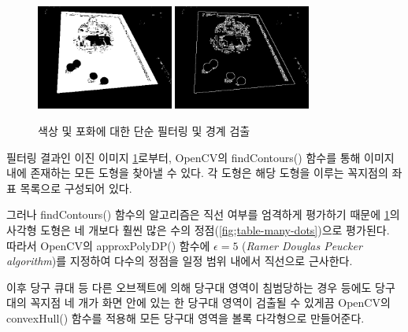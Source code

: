 \documentclass[10pt]{oblivoir}
\begin{document}
\begin{figure}[ht]
    \centering
    \includegraphics[width=0.4\textwidth]{img/billiards-table-filter.png}
    \includegraphics[width=0.4\textwidth]{img/billiards-table-edge.png}
    \caption{색상 및 포화에 대한 단순 필터링 및 경계 검출}
    \label{fig;table-filtered}
\end{figure}

필터링 결과인 이진 이미지 \cref{fig;table-filtered}로부터, OpenCV의 findContours() 함수를 통해 이미지 내에 존재하는 모든 도형을 찾아낼 수 있다. 각 도형은 해당 도형을 이루는 꼭지점의 좌표 목록으로 구성되어 있다.

그러나 findContours() 함수의 알고리즘은 직선 여부를 엄격하게 평가하기 때문에 \cref{fig;table-filtered}의 사각형 도형은 네 개보다 훨씬 많은 수의 정점(\cref{fig;table-many-dots})으로 평가된다. 따라서 OpenCV의 approxPolyDP() 함수에 $\epsilon = 5$ (\textit{Ramer Douglas Peucker algorithm})를 지정하여 다수의 정점을 일정 범위 내에서 직선으로 근사한다.

이후 당구 큐대 등 다른 오브젝트에 의해 당구대 영역이 침범당하는 경우 등에도 당구대의 꼭지점 네 개가 화면 안에 있는 한 당구대 영역이 검출될 수 있게끔 OpenCV의 convexHull() 함수를 적용해 모든 당구대 영역을 볼록 다각형으로 만들어준다.
\end{document}
